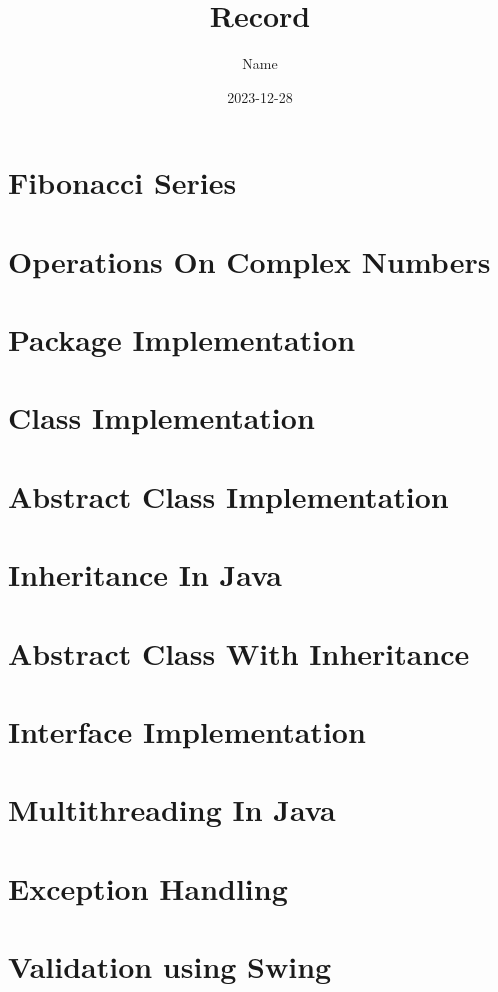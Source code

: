 \documentclass{article}
\title{Record}
\author{Name}
\date{2023-12-28}
\begin{document}
\tableofcontents
\newpage

\section{Fibonacci Series}
\newpage

\section{Operations On Complex Numbers}
\newpage

\section{Package Implementation}
\newpage

\section{Class Implementation}
\newpage

\section{Abstract Class Implementation}
\newpage

\section{Inheritance In Java}
\newpage

\section{Abstract Class With Inheritance}
\newpage

\section{Interface Implementation}
\newpage

\section{Multithreading In Java}
\newpage

\section{Exception Handling}
\newpage

\section{Validation using Swing}

\newpage
\end{document}
